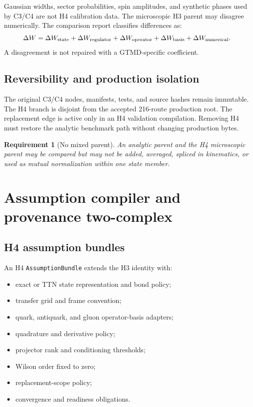 \documentclass[11pt]{article}
\newtheorem{requirement}[definition]{Requirement}
\newcommand{\AssumptionBundle}{\texttt{AssumptionBundle}}
\begin{document}
Gaussian widths, sector probabilities, spin amplitudes, and synthetic phases
used by C3/C4 are not H4 calibration data.  The microscopic H3 parent may
disagree numerically.  The comparison report classifies differences as:
\begin{equation}
 \Delta W
 =\Delta W_{\rm state}
 +\Delta W_{\rm regulator}
 +\Delta W_{\rm operator}
 +\Delta W_{\rm basis}
 +\Delta W_{\rm numerical}.
 \label{eq:pilot-difference}
\end{equation}
A disagreement is not repaired with a GTMD-specific coefficient.

\subsection{Reversibility and production isolation}

The original C3/C4 nodes, manifests, tests, and source hashes remain immutable.
The H4 branch is disjoint from the accepted 216-route production root.  The
replacement edge is active only in an H4 validation compilation.  Removing H4
must restore the analytic benchmark path without changing production bytes.

\begin{requirement}[No mixed parent]
\label{req:no-mixed-parent}
An analytic parent and the H4 microscopic parent may be compared but may not be
added, averaged, spliced in kinematics, or used as mutual normalization within
one state member.
\end{requirement}

\section{Assumption compiler and provenance two-complex}
\label{sec:compiler}

\subsection{H4 assumption bundles}

An H4 \AssumptionBundle{} extends the H3 identity with:
\begin{itemize}
\item exact or TTN state representation and bond policy;
\item transfer grid and frame convention;
\item quark, antiquark, and gluon operator-basis adapters;
\item quadrature and derivative policy;
\item projector rank and conditioning thresholds;
\item Wilson order fixed to zero;
\item replacement-scope policy;
\item convergence and readiness obligations.
\end{itemize}
\end{document}
